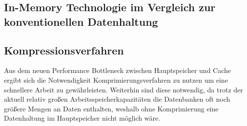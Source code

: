 \documentclass[a4paper, 12pt]{scrartcl}
\begin{document}
\subsection{In-Memory Technologie im Vergleich zur konventionellen Datenhaltung}

\newpage
\subsection{Kompressionsverfahren}
Aus dem neuen Performance Bottleneck zwischen Hauptspeicher und Cache ergibt sich die Notwendigkeit Komprimierungsverfahren zu nutzen um eine  schnellere Arbeit zu gewährleisten. Weiterhin sind diese notwendig, da trotz der aktuell relativ großen Arbeitsspeicherkapazitäten die Datenbanken oft noch größere Mengen an Daten enthalten, weshalb ohne Komprimierung eine Datenhaltung im Hauptspeicher nicht möglich wäre. 
\end{document}
